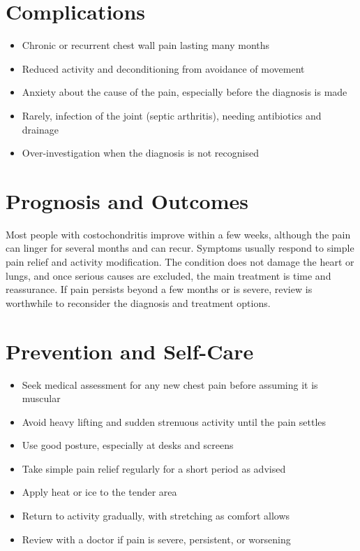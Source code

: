 \section*{Complications}
\begin{itemize}
    \item Chronic or recurrent chest wall pain lasting many months
    \item Reduced activity and deconditioning from avoidance of movement
    \item Anxiety about the cause of the pain, especially before the diagnosis is made
    \item Rarely, infection of the joint (septic arthritis), needing antibiotics and drainage
    \item Over-investigation when the diagnosis is not recognised
\end{itemize}

\section*{Prognosis and Outcomes}
Most people with costochondritis improve within a few weeks, although the pain can linger for several months and can recur. Symptoms usually respond to simple pain relief and activity modification. The condition does not damage the heart or lungs, and once serious causes are excluded, the main treatment is time and reassurance. If pain persists beyond a few months or is severe, review is worthwhile to reconsider the diagnosis and treatment options.

\section*{Prevention and Self-Care}
\begin{itemize}
    \item Seek medical assessment for any new chest pain before assuming it is muscular
    \item Avoid heavy lifting and sudden strenuous activity until the pain settles
    \item Use good posture, especially at desks and screens
    \item Take simple pain relief regularly for a short period as advised
    \item Apply heat or ice to the tender area
    \item Return to activity gradually, with stretching as comfort allows
    \item Review with a doctor if pain is severe, persistent, or worsening
\end{itemize}

